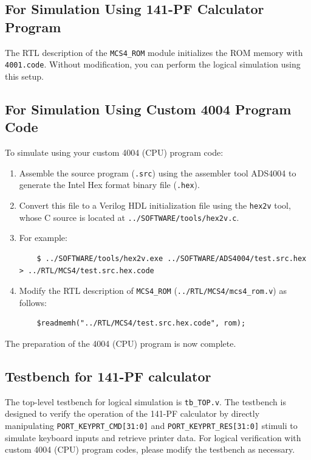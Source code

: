 \subsection{For Simulation Using 141-PF Calculator Program}
The RTL description of the \texttt{MCS4\_ROM} module initializes the ROM memory with \texttt{4001.code}. Without modification, you can perform the logical simulation using this setup.

\subsection{For Simulation Using Custom 4004 Program Code}
To simulate using your custom 4004 (CPU) program code:
\begin{enumerate}
    \item Assemble the source program (\texttt{.src}) using the assembler tool ADS4004 to generate the Intel Hex format binary file (\texttt{.hex}).
    \item Convert this file to a Verilog HDL initialization file using the \texttt{hex2v} tool, whose C source is located at \texttt{../SOFTWARE/tools/hex2v.c}.
    \item For example:
    \begin{verbatim}
    $ ../SOFTWARE/tools/hex2v.exe ../SOFTWARE/ADS4004/test.src.hex > ../RTL/MCS4/test.src.hex.code
    \end{verbatim}
    \item Modify the RTL description of \texttt{MCS4\_ROM} (\texttt{../RTL/MCS4/mcs4\_rom.v}) as follows:
    \begin{verbatim}
    $readmemh("../RTL/MCS4/test.src.hex.code", rom);
    \end{verbatim}
\end{enumerate}

The preparation of the 4004 (CPU) program is now complete.

\subsection{Testbench for 141-PF calculator}
The top-level testbench for logical simulation is \texttt{tb\_TOP.v}. The testbench is designed to verify the operation of the 141-PF calculator by directly manipulating \texttt{PORT\_KEYPRT\_CMD[31:0]} and \texttt{PORT\_KEYPRT\_RES[31:0]} stimuli to simulate keyboard inputs and retrieve printer data. For logical verification with custom 4004 (CPU) program codes, please modify the testbench as necessary.

